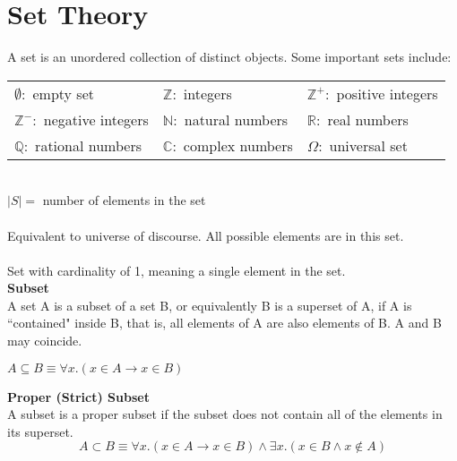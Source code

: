\documentclass{article}
\numberwithin{theorem}{subsection}
\numberwithin{theorem}{subsubsection}
\numberwithin{lemma}{subsection}
\numberwithin{lemma}{subsubsection}
\theoremstyle{definition}
\numberwithin{definition}{subsection}
\numberwithin{definition}{subsubsection}
\begin{document}
\section{Set Theory}
A set is an unordered collection of distinct objects. Some important sets include:

\begin{table}[H]
    \centering
    \begin{tabular}{l l l}
         $\emptyset : $ empty set & $\mathbb{Z}:$ integers & $\mathbb{Z}^{+}:$ positive integers \\
         $\mathbb{Z}^{-}:$ negative integers & $\mathbb{N}:$ natural numbers & $\mathbb{R}:$ real numbers \\
         $\mathbb{Q}:$ rational numbers & $\mathbb{C}:$ complex numbers & $\Omega:$ universal set
    \end{tabular}
    \label{tab:my_label}
\end{table}

 \\
\indent $|S| = $ number of elements in the set \\

 \\
\indent Equivalent to universe of discourse. All possible elements are in this set.\\

 \\
\indent Set with cardinality of 1, meaning a single element in the set.\\

\noindent \textbf{Subset} \\
\indent A set A is a subset of a set B, or equivalently B is a superset of A, if A is ``contained" inside B, that is, all elements of A are also elements of B. A and B may coincide.
\begin{center}
    $A \subseteq B \equiv \forall x.(x \in A \rightarrow x \in B)$\\    
\end{center}

\noindent \textbf{Proper (Strict) Subset} \\
\indent A subset is a proper subset if the subset does not contain all of the elements in its superset.
\begin{equation*}
    A \subset B \equiv \forall x.(x \in A \rightarrow x \in B) \land \exists x.(x \in B \land x \notin A)   
\end{equation*}
\end{document}
